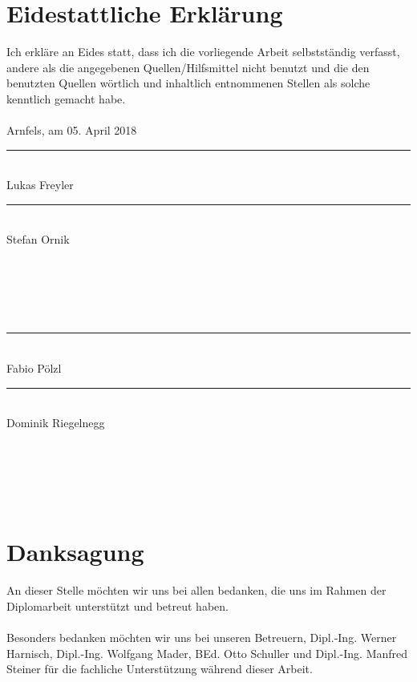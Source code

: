 \frontmatter												%
\addtocounter{page}{2}

\newcommand{\doublesignature}[2]{%
  \parbox{\textwidth}{
    \hfill
    \parbox{7cm}{
      \centering
      \rule{6cm}{1pt}\\
      #1
    }
    \parbox{7cm}{
      \centering
      \rule{6cm}{1pt}\\
      #2
    }
  }
  \mbox{}\\
  \mbox{}\\
  \mbox{}\\
  \mbox{}\\
}

\vspace*{20pt}

\section*{Eidestattliche Erklärung}
\label{sec:eidestattliche-erklaerung}
Ich erkläre an Eides statt, dass ich die vorliegende Arbeit selbstständig verfasst, andere als die angegebenen
Quellen/Hilfsmittel nicht benutzt und die den benutzten Quellen wörtlich und inhaltlich entnommenen
Stellen als solche kenntlich gemacht habe.\\
\\
Arnfels, am 05. April 2018\\

\vskip 2cm

\doublesignature{Lukas Freyler}{Stefan Ornik}
\doublesignature{Fabio Pölzl}{Dominik Riegelnegg}

\vskip 5cm

\clearpage

\newpage
\thispagestyle{empty}
\mbox{}

\clearpage

\section*{Danksagung}
\label{sec:danksagung}
An dieser Stelle möchten wir uns bei allen bedanken, die uns im Rahmen der Diplomarbeit unterstützt und betreut haben.\\
\\
Besonders bedanken möchten wir uns bei unseren Betreuern, Dipl.-Ing. Werner Harnisch, Dipl.-Ing. Wolfgang Mader, BEd. Otto Schuller
und Dipl.-Ing. Manfred Steiner für die fachliche Unterstützung während dieser Arbeit.

\clearpage


